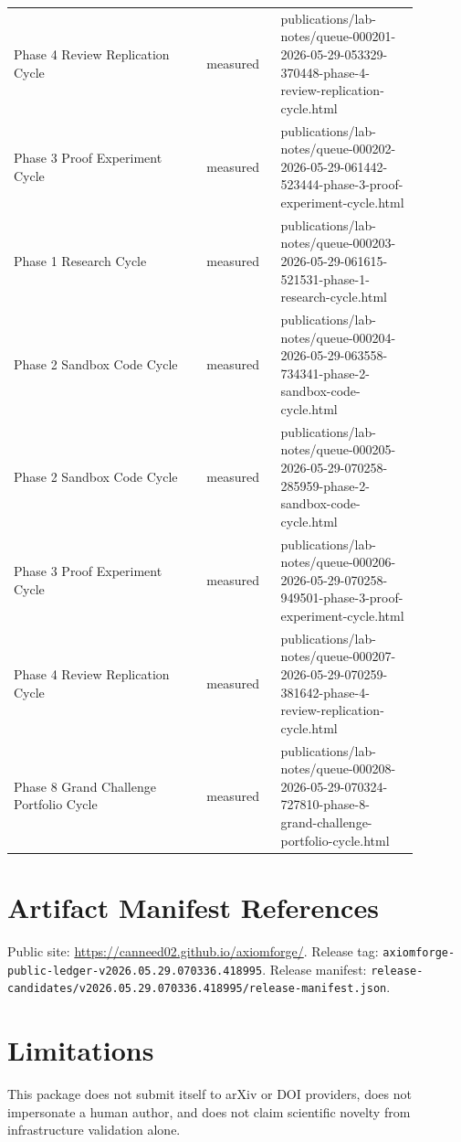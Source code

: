 \documentclass[11pt]{article}
\begin{document}
\begin{longtable}{p{0.42\linewidth}p{0.16\linewidth}p{0.30\linewidth}}
Phase 4 Review Replication Cycle & measured & publications/lab-notes/queue-000201-2026-05-29-053329-370448-phase-4-review-replication-cycle.html \\
Phase 3 Proof Experiment Cycle & measured & publications/lab-notes/queue-000202-2026-05-29-061442-523444-phase-3-proof-experiment-cycle.html \\
Phase 1 Research Cycle & measured & publications/lab-notes/queue-000203-2026-05-29-061615-521531-phase-1-research-cycle.html \\
Phase 2 Sandbox Code Cycle & measured & publications/lab-notes/queue-000204-2026-05-29-063558-734341-phase-2-sandbox-code-cycle.html \\
Phase 2 Sandbox Code Cycle & measured & publications/lab-notes/queue-000205-2026-05-29-070258-285959-phase-2-sandbox-code-cycle.html \\
Phase 3 Proof Experiment Cycle & measured & publications/lab-notes/queue-000206-2026-05-29-070258-949501-phase-3-proof-experiment-cycle.html \\
Phase 4 Review Replication Cycle & measured & publications/lab-notes/queue-000207-2026-05-29-070259-381642-phase-4-review-replication-cycle.html \\
Phase 8 Grand Challenge Portfolio Cycle & measured & publications/lab-notes/queue-000208-2026-05-29-070324-727810-phase-8-grand-challenge-portfolio-cycle.html \\
\end{longtable}

\section*{Artifact Manifest References}
Public site: \url{https://canneed02.github.io/axiomforge/}. Release tag:
\texttt{axiomforge-public-ledger-v2026.05.29.070336.418995}.
Release manifest:
\texttt{release-candidates/v2026.05.29.070336.418995/release-manifest.json}.

\section*{Limitations}
This package does not submit itself to arXiv or DOI providers, does not
impersonate a human author, and does not claim scientific novelty from
infrastructure validation alone.



\end{document}
